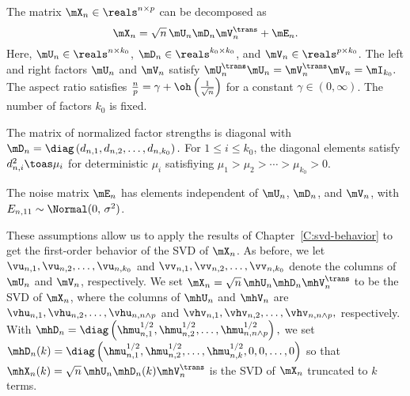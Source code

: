 \begin{assumption}
    The matrix $\mX_n \in \reals^{n \times p}$ can be decomposed as
    \[
        \mX_n = \sqrt{n} \, \mU_n \mD_n \mV_n^\trans + \mE_n.
    \]
    Here, 
    $\mU_n \in \reals^{n \times k_0}$, $\mD_n \in \reals^{k_0 \times k_0}$,
    and $\mV_n \in \reals^{p \times k_0}$.  The left and right factors
    $\mU_n$ and $\mV_n$ satisfy
    \(
        \mU_n^\trans \mU_n = \mV_n^\trans \mV_n = \mI_{k_0}.
    \)
    The aspect ratio satisfies
    $\frac{n}{p} = \gamma + \oh\left( \frac{1}{\sqrt{n}}\right)$ for a
    constant $\gamma \in (0, \infty)$.  The number of factors $k_0$
    is fixed.
\end{assumption}

\begin{assumption}
    The matrix of normalized factor strengths is diagonal with
    \(
        \mD_n
            =
                \diag \left(
                    d_{n,1}, d_{n,2}, \ldots, d_{n,k_0}
                \right).
    \)
    For $1 \leq i \leq k_0$, the diagonal elements satisfy
    $d_{n,i}^2 \toas \mu_i$ for deterministic $\mu_i$ satisfiying
    \(
        \mu_1 > \mu_2 > \cdots > \mu_{k_0} > 0.
    \)
\end{assumption}

\begin{assumption}
    The noise matrix $\mE_n$ has \iid elements independent of $\mU_n$, 
    $\mD_n$, and $\mV_n$, with $E_{n,11} \sim \Normal( 0, \, \sigma^2)$.
\end{assumption}

\noindent
These assumptions allow us to apply the results of 
Chapter~\ref{C:svd-behavior} to get the first-order behavior of the
SVD of $\mX_n$.  As before, we let $\vu_{n,1}, \vu_{n,2}, \ldots, \vu_{n,k_0}$
and $\vv_{n,1}, \vv_{n,2}, \ldots, \vv_{n,k_0}$ denote the columns of
$\mU_n$ and $\mV_n$, respectively.  We set 
$\mX_n = \sqrt{n} \, \mhU_n \mhD_n \mhV_n^\trans$ to be the SVD of $\mX_n$,
where the columns of $\mhU_n$ and $\mhV_n$ are
\(
    \vhu_{n,1}, \vhu_{n,2}, \ldots, \vhu_{n,n\wedge p}
\)
and
\(
    \vhv_{n,1}, \vhv_{n,2}, \ldots, \vhv_{n,n\wedge p},
\)
respectively.  With
\(
    \mhD_n 
        = 
            \diag \left(
                \hmu_{n,1}^{1/2}, 
                \hmu_{n,2}^{1/2}, 
                \ldots, 
                \hmu_{n,n\wedge p}^{1/2}
            \right),
\)
we set
\(
    \mhD_n(k)
        =
            \diag \left(
                \hmu_{n,1}^{1/2}, 
                \hmu_{n,2}^{1/2}, 
                \ldots, 
                \hmu_{n,k}^{1/2}, 
                0, 
                0,
                \ldots, 
                0
            \right)
\)
so that
\(
    \mhX_{n}(k) = \sqrt{n} \, \mhU_n \mhD_n(k) \mhV_n^\trans
\)
is the SVD of $\mX_n$ truncated to $k$ terms.

